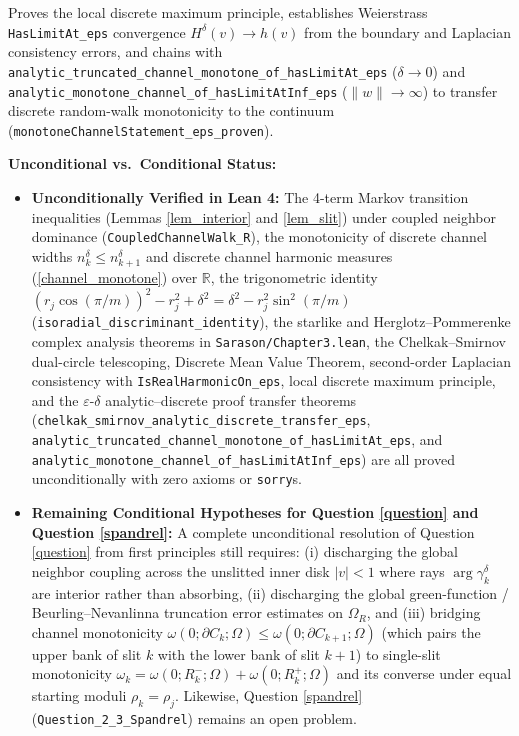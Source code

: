 \documentclass[]{amsart}
\numberwithin{equation}{section}
\newcommand{\R}{\mathbb{R}}
\newcommand{\eps}{\varepsilon}
\begin{document}
\begin{enumerate}
Proves the local discrete maximum principle, establishes Weierstrass \texttt{HasLimitAt\_eps} convergence $H^{\delta}(v) \to h(v)$ from the boundary and Laplacian consistency errors, and chains with \texttt{analytic\_truncated\_channel\_monotone\_of\_hasLimitAt\_eps} ($\delta \to 0$) and \texttt{analytic\_monotone\_channel\_of\_hasLimitAtInf\_eps} ($\|w\| \to \infty$) to transfer discrete random-walk monotonicity to the continuum (\texttt{monotoneChannelStatement\_eps\_proven}).
\end{enumerate}

\medskip
\noindent\textbf{Unconditional vs.\ Conditional Status:}
\begin{itemize}
\item \textbf{Unconditionally Verified in Lean 4:}
The 4-term Markov transition inequalities (Lemmas \ref{lem_interior} and \ref{lem_slit}) under coupled neighbor dominance (\texttt{CoupledChannelWalk\_R}), the monotonicity of discrete channel widths $n_k^{\delta} \le n_{k+1}^{\delta}$ and discrete channel harmonic measures (\ref{channel_monotone}) over $\R$, the trigonometric identity $(r_j\cos(\pi/m))^2 - r_j^2 + \delta^2 = \delta^2 - r_j^2\sin^2(\pi/m)$ (\texttt{isoradial\_discriminant\_identity}), the starlike and Herglotz--Pommerenke complex analysis theorems in \texttt{Sarason/Chapter3.lean}, the Chelkak--Smirnov dual-circle telescoping, Discrete Mean Value Theorem, second-order Laplacian consistency with \texttt{IsRealHarmonicOn\_eps}, local discrete maximum principle, and the $\eps$-$\delta$ analytic--discrete proof transfer theorems (\texttt{chelkak\_smirnov\_analytic\_discrete\_transfer\_eps}, \texttt{analytic\_truncated\_channel\_monotone\_of\_hasLimitAt\_eps}, and \texttt{analytic\_monotone\_channel\_of\_hasLimitAtInf\_eps}) are all proved unconditionally with zero axioms or \texttt{sorry}s.
\item \textbf{Remaining Conditional Hypotheses for Question \ref{question} and Question \ref{spandrel}:}
A complete unconditional resolution of Question \ref{question} from first principles still requires: (i) discharging the global neighbor coupling across the unslitted inner disk $|v| < 1$ where rays $\arg \gamma_k^{\delta}$ are interior rather than absorbing, (ii) discharging the global green-function / Beurling--Nevanlinna truncation error estimates on $\varOmega_R$, and (iii) bridging channel monotonicity $\omega(0; \partial C_k; \varOmega) \le \omega(0; \partial C_{k+1}; \varOmega)$ (which pairs the upper bank of slit $k$ with the lower bank of slit $k+1$) to single-slit monotonicity $\omega_k = \omega(0; R_k^-; \varOmega) + \omega(0; R_k^+; \varOmega)$ and its converse under equal starting moduli $\rho_k = \rho_j$. Likewise, Question \ref{spandrel} (\texttt{Question\_2\_3\_Spandrel}) remains an open problem.
\end{itemize}
\end{document}
